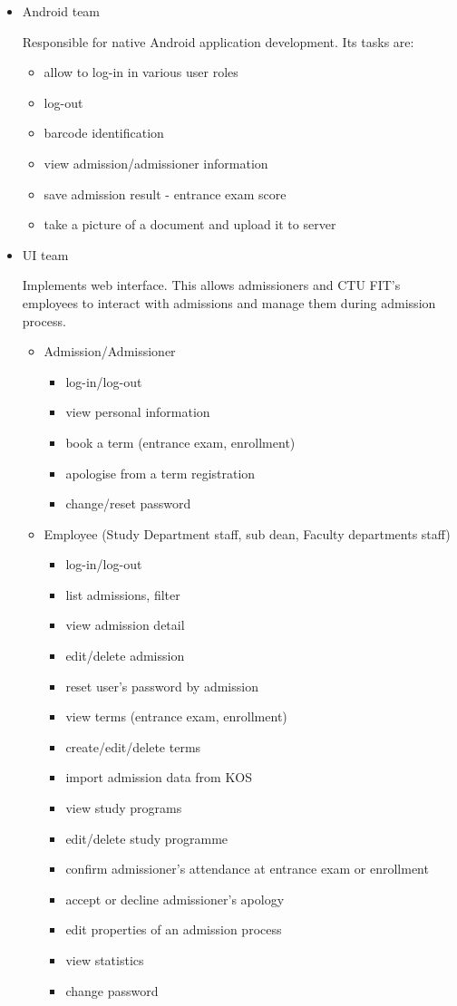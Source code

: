 	\begin{itemize}
		\item Android team

		Responsible for native Android application development. Its tasks are:
			\begin{itemize}
				\item allow to log-in in various user roles
				\item log-out
				\item barcode identification
				\item view admission/admissioner information
				\item save admission result - entrance exam score
				\item take a picture of a document and upload it to server 
			\end{itemize}
	  \item UI team
	  
	  	Implements web interface. This allows admissioners and CTU FIT's employees to interact with admissions and
	  	manage them during admission process.
		\begin{itemize}
			\item Admission/Admissioner
			\begin{itemize}
				\item log-in/log-out
				\item view personal information
				\item book a term (entrance exam, enrollment)
				\item apologise from a term registration
				\item change/reset password
			\end{itemize}
			\item Employee (Study Department staff, sub dean, Faculty departments staff)
			\begin{itemize}
			  	\item log-in/log-out
				\item list admissions, filter
				\item view admission detail
				\item edit/delete admission
				\item reset user's password by admission
				\item view terms (entrance exam, enrollment)
				\item create/edit/delete terms
				\item import admission data from \gls{KOS}
				\item view study programs
				\item edit/delete study programme
				\item confirm admissioner's attendance at entrance exam or enrollment
				\item accept or decline admissioner's apology
				\item edit properties of an admission process 
				\item view statistics
				\item change password
			\end{itemize}
		\end{itemize} 
	\end{itemize}

